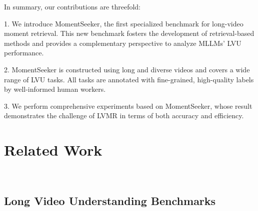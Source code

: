 \documentclass{article}
\begin{document}
In summary, our contributions are threefold:

1. We introduce MomentSeeker, the first specialized benchmark for long-video moment retrieval. This new benchmark fosters the development of retrieval-based methods and provides a complementary perspective to analyze MLLMs' LVU performance. 

2. MomentSeeker is constructed using long and diverse videos and covers a wide range of LVU tasks. All tasks are annotated with fine-grained, high-quality labels by well-informed human workers. 

3. We perform comprehensive experiments based on MomentSeeker, whose result demonstrates the challenge of LVMR in terms of both accuracy and efficiency.  






\section{Related Work}~\label{sec:related_work}

\subsection{Long Video Understanding Benchmarks}

\end{document}
